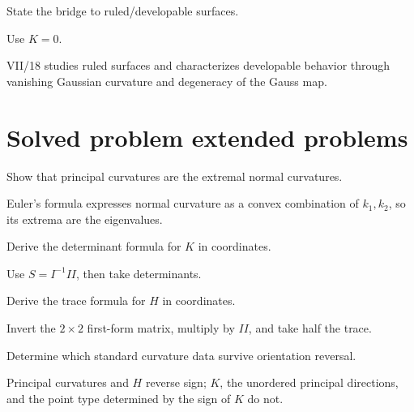\begin{exercise}\label{exr:vii17-24}
State the bridge to ruled/developable surfaces.
\end{exercise}
\begin{hint}
Use \(K=0\).
\end{hint}
\begin{solution}
VII/18 studies ruled surfaces and characterizes developable behavior through vanishing Gaussian curvature and degeneracy of the Gauss map.
\end{solution}

\section{Solved problem extended problems}
\begin{problem}\label{prob:vii17-01}
Show that principal curvatures are the extremal normal curvatures.
\end{problem}
\begin{solution}
Euler's formula expresses normal curvature as a convex combination of \(k_1,k_2\), so its extrema are the eigenvalues.
\end{solution}

\begin{problem}\label{prob:vii17-02}
Derive the determinant formula for \(K\) in coordinates.
\end{problem}
\begin{solution}
Use \(S=I^{-1}II\), then take determinants.
\end{solution}

\begin{problem}\label{prob:vii17-03}
Derive the trace formula for \(H\) in coordinates.
\end{problem}
\begin{solution}
Invert the \(2\times2\) first-form matrix, multiply by \(II\), and take half the trace.
\end{solution}

\begin{problem}\label{prob:vii17-04}
Determine which standard curvature data survive orientation reversal.
\end{problem}
\begin{solution}
Principal curvatures and \(H\) reverse sign; \(K\), the unordered principal directions, and the point type determined by the sign of \(K\) do not.
\end{solution}

